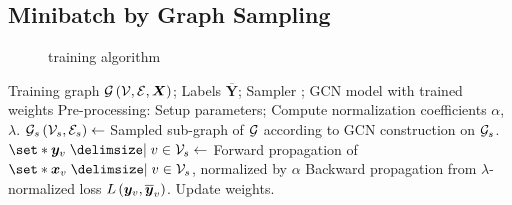 

\subsection{Minibatch by Graph Sampling\label{sec: gsaint}}



\begin{figure}[!htb]
    \centering
    
\caption{{\graphsaint} training algorithm}
    \label{fig: gsaint overall}
\end{figure}


\begin{algorithm}
\caption{{\graphsaint} training algorithm}
\label{algo: gsaint meta}
\begin{algorithmic}[1]
\renewcommand{\algorithmicrequire}{\textbf{Input:}}
\renewcommand{\algorithmicensure}{\textbf{Output:}}
\Require Training graph $\G\paren{\V,\E,\X}$; Labels $\overline{\bm{Y}}$; Sampler \sample;
\Ensure GCN model with trained weights
\State Pre-processing: Setup {\sample} parameters; Compute normalization coefficients $\alpha$, $\lambda$.
    \State $\G[s]\paren{\V[s],\E[s]} \gets$ Sampled sub-graph of $\G$ according to {\sample}
    \State GCN construction on $\G[s]$.
    \State $\set*{\bm{y}_v\given v\in\V[s]}\gets$ Forward propagation of $\set*{\bm{x}_v\given v\in \V[s]}$, normalized by $\alpha$
    \State Backward propagation from $\lambda$-normalized loss $L\left( \bm{y}_v,\overline{\bm{y}}_v \right)$. Update weights. 
\EndFor
\end{algorithmic} 
\end{algorithm}



